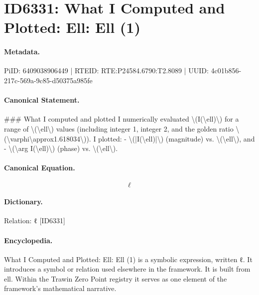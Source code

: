 \section*{ID6331: What I Computed and Plotted: Ell: Ell (1)}
\paragraph{Metadata.}
PiID: 6409038906449 | RTEID: RTE:P24584.6790:T2.8089 | UUID: 4c01b856-217c-569a-9c85-d50375a985fe

\paragraph{Canonical Statement.}
\#\#\# What I computed and plotted I numerically evaluated \textbackslash{}(I(\textbackslash{}ell)\textbackslash{}) for a range of \textbackslash{}(\textbackslash{}ell\textbackslash{}) values (including integer 1, integer 2, and the golden ratio \textbackslash{}(\textbackslash{}varphi\textbackslash{}approx1.618034\textbackslash{})). I plotted: - \textbackslash{}(|I(\textbackslash{}ell)|\textbackslash{}) (magnitude) vs. \textbackslash{}(\textbackslash{}ell\textbackslash{}), and - \textbackslash{}(\textbackslash{}arg I(\textbackslash{}ell)\textbackslash{}) (phase) vs. \textbackslash{}(\textbackslash{}ell\textbackslash{}).

\paragraph{Canonical Equation.}
\[
\ell
\]

\paragraph{Dictionary.}
Relation: ℓ [ID6331]

\paragraph{Encyclopedia.}
What I Computed and Plotted: Ell: Ell (1) is a symbolic expression, written ℓ. It introduces a symbol or relation used elsewhere in the framework. It is built from ell. Within the Trawin Zero Point registry it serves as one element of the framework's mathematical narrative.
